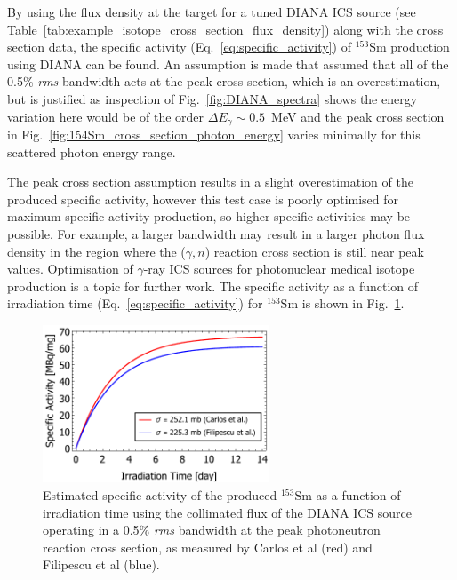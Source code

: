 \documentclass[../main.tex]{subfiles}
\begin{document}
By using the flux density at the target for a tuned DIANA ICS source (see Table~\ref{tab:example_isotope_cross_section_flux_density}) along with the cross section data, the specific activity (Eq.~\ref{eq:specific_activity}) of $^{153}\mathrm{Sm}$ production using DIANA can be found. An assumption is made that assumed that all of the 0.5\% \textit{rms} bandwidth acts at the peak cross section, which is an overestimation, but is justified as inspection of Fig.~\ref{fig:DIANA_spectra} shows the energy variation here would be of the order $\Delta E_{\gamma}\sim0.5$~\si{\mega\electronvolt} and the peak cross section in Fig.~\ref{fig:154Sm_cross_section_photon_energy} varies minimally for this scattered photon energy range. 

The peak cross section assumption results in a slight overestimation of the produced specific activity, however this test case is poorly optimised for maximum specific activity production, so higher specific activities may be possible. For example, a larger bandwidth may result in a larger photon flux density in the region where the ($\gamma,n$) reaction cross section is still near peak values. Optimisation of $\gamma$-ray ICS sources for photonuclear medical isotope production is a topic for further work. The specific activity as a function of irradiation time (Eq.~\ref{eq:specific_activity}) for $^{153}\mathrm{Sm}$ is shown in Fig.~\ref{fig:153Sm_specific_activity}.
\begin{figure}[!h]
\centering
\includegraphics[width=0.6\textwidth]{Figures/DIANA_Inverse_Compton_Source_Design/154Sm_specific_activity.pdf}
\caption{Estimated specific activity of the produced $^{153}\mathrm{Sm}$ as a function of irradiation time using the collimated flux of the DIANA ICS source operating in a 0.5\% \textit{rms} bandwidth at the peak photoneutron reaction cross section, as measured by Carlos et al \cite{carlos1974giant} (red) and Filipescu et al \cite{filipescu2014photoneutron} (blue).}
\label{fig:153Sm_specific_activity}
\end{figure}
\end{document}
